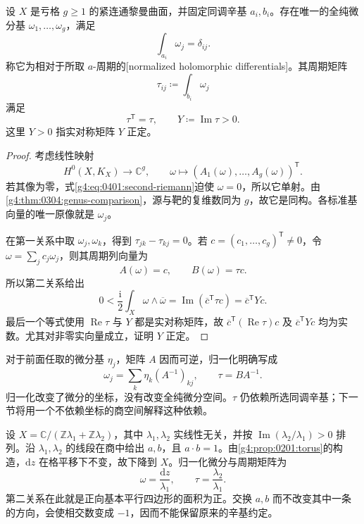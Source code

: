 \begin{theorem}
	\label{g4:thm:0401:normalized-periods}
	设 \(X\) 是亏格 \(g\ge1\) 的紧连通黎曼曲面，并固定同调辛基 \(a_i,b_i\)。存在唯一的全纯微分基 \(\omega_1,\ldots,\omega_g\)，满足
	\begin{equation}\label{g4:eq:0401:normalized-a}
		\int_{a_i}\omega_j=\delta_{ij}.
	\end{equation}
	称它为相对于所取 \(a\)-周期的[normalized holomorphic differentials]。其周期矩阵
	\begin{equation}\label{g4:eq:0401:tau-definition}
		\tau_{ij}\coloneqq\int_{b_i}\omega_j
	\end{equation}
	满足
	\begin{equation}\label{g4:eq:0401:tau-properties}
		\tau^{\mathsf T}=\tau,
		\qquad Y\coloneqq\operatorname{Im}\tau>0.
	\end{equation}
	这里 \(Y>0\) 指实对称矩阵 \(Y\) 正定。
\end{theorem}
\begin{proof}
	考虑线性映射
	\[
		H^0(X,K_X)\longrightarrow\mathbb C^g,
		\qquad\omega\longmapsto(A_1(\omega),\ldots,A_g(\omega))^{\mathsf T}.
	\]
	若其像为零，式\eqref{g4:eq:0401:second-riemann}迫使 \(\omega=0\)，所以它单射。由\cref{g4:thm:0304:genus-comparison}，源与靶的复维数同为 \(g\)，故它是同构。各标准基向量的唯一原像就是 \(\omega_j\)。

	在第一关系中取 \(\omega_j,\omega_k\)，得到 \(\tau_{jk}-\tau_{kj}=0\)。若 \(c=(c_1,\ldots,c_g)^{\mathsf T}\ne0\)，令 \(\omega=\sum_jc_j\omega_j\)，则其周期列向量为
	\[
		A(\omega)=c,\qquad B(\omega)=\tau c.
	\]
	所以第二关系给出
	\[
		0<\frac{\mathrm{i}}2\int_X\omega\wedge\overline\omega
		=\operatorname{Im}(\overline c^{\mathsf T}\tau c)
		=\overline c^{\mathsf T}Yc.
	\]
	最后一个等式使用 \(\operatorname{Re}\tau\) 与 \(Y\) 都是实对称矩阵，故 \(\overline c^{\mathsf T}(\operatorname{Re}\tau)c\) 及 \(\overline c^{\mathsf T}Yc\) 均为实数。尤其对非零实向量成立，证明 \(Y\) 正定。
\end{proof}

对于前面任取的微分基 \(\eta_j\)，矩阵 \(A\) 因而可逆，归一化明确写成
\[
	\omega_j=\sum_k\eta_k(A^{-1})_{kj},
	\qquad \tau=BA^{-1}.
\]
归一化改变了微分的坐标，没有改变全纯微分空间。\(\tau\) 仍依赖所选同调辛基；下一节将用一个不依赖坐标的商空间解释这种依赖。

\begin{example}
	\label{g4:exm:0401:torus-periods}
	设 \(X=\mathbb C/(\mathbb Z\lambda_1+\mathbb Z\lambda_2)\)，其中 \(\lambda_1,\lambda_2\) 实线性无关，并按 \(\operatorname{Im}(\lambda_2/\lambda_1)>0\) 排列。沿 \(\lambda_1,\lambda_2\) 的线段在商中给出 \(a,b\)，且 \(a\cdot b=1\)。由\cref{g4:prop:0201:torus}的构造，\(\mathrm{d}z\) 在格平移下不变，故下降到 \(X\)。归一化微分与周期矩阵为
	\[
		\omega=\frac{\mathrm{d}z}{\lambda_1},
		\qquad \tau=\frac{\lambda_2}{\lambda_1}.
	\]
	第二关系在此就是正向基本平行四边形的面积为正。交换 \(a,b\) 而不改变其中一条的方向，会使相交数变成 \(-1\)，因而不能保留原来的辛基约定。
\end{example}

